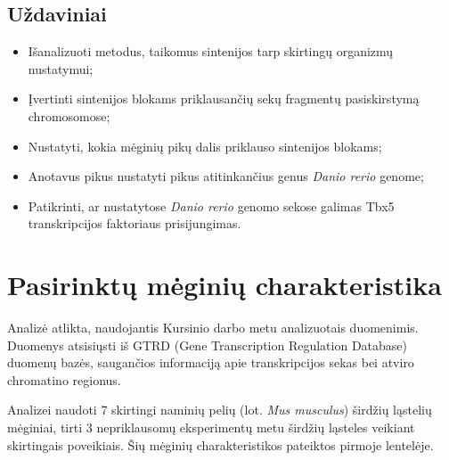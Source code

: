 \documentclass[12pt]{article}
\begin{document}
\subsection*{Uždaviniai}
\begin{itemize}
    \item Išanalizuoti metodus, taikomus sintenijos tarp skirtingų organizmų
    nustatymui;
    \item Įvertinti sintenijos blokams priklausančių sekų fragmentų
    pasiskirstymą chromosomose;
    \item Nustatyti, kokia mėginių pikų dalis priklauso sintenijos blokams;
    \item Anotavus pikus nustatyti pikus atitinkančius genus \emph{Danio rerio}
    genome;
    \item Patikrinti, ar nustatytose \emph{Danio rerio} genomo sekose galimas
    Tbx5 transkripcijos faktoriaus prisijungimas.
\end{itemize}

\newpage


\section{Pasirinktų mėginių charakteristika}
Analizė atlikta, naudojantis Kursinio darbo metu analizuotais duomenimis.
Duomenys atsisiųsti iš GTRD (Gene Transcription Regulation Database)\cite{GTRD}
duomenų bazės, saugančios informaciją apie transkripcijos sekas bei atviro
chromatino regionus.

Analizei naudoti 7 skirtingi naminių pelių (lot. \emph{Mus musculus}) širdžių
ląstelių mėginiai, tirti 3 nepriklausomų eksperimentų metu širdžių ląsteles
veikiant skirtingais poveikiais. Šių mėginių charakteristikos pateiktos pirmoje
lentelėje.
\end{document}
